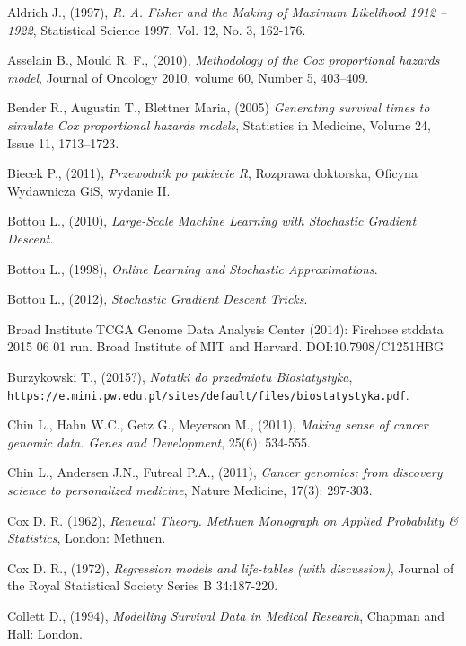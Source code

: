 \begin{thebibliography}{99}

 Aldrich J., (1997), \textit{R. A. Fisher and the Making of Maximum Likelihood 1912 – 1922}, Statistical Science 1997, Vol. 12, No. 3, 162-176.

 Asselain B., Mould R. F., (2010), \textit{Methodology of the Cox proportional hazards model},  Journal of Oncology 2010, volume 60, Number 5,  403–409.

 Bender R., Augustin T., Blettner Maria, (2005) \textit{Generating survival times to simulate Cox proportional hazards models}, Statistics in Medicine, Volume 24, Issue 11, 1713–1723.

 Biecek P., (2011), \textit{Przewodnik po pakiecie R}, Rozprawa doktorska, Oficyna Wydawnicza GiS, wydanie II.

 Bottou L., (2010), \textit{Large-Scale Machine Learning with Stochastic Gradient Descent}.

 Bottou L., (1998), \textit{Online Learning and Stochastic Approximations}.

 Bottou L., (2012), \textit{Stochastic Gradient Descent Tricks}.

 Broad Institute TCGA Genome Data Analysis Center (2014): Firehose stddata 2015 06 01 run. Broad Institute of MIT and Harvard. DOI:10.7908/C1251HBG

 Burzykowski T., (2015?), \textit{Notatki do przedmiotu Biostatystyka}, \texttt{https://e.mini.pw.edu.pl/sites/default/files/biostatystyka.pdf}.

 Chin L., Hahn W.C., Getz G., Meyerson M., (2011), \textit{Making sense of cancer genomic data. Genes and Development}, 25(6): 534-555.

 Chin L., Andersen J.N., Futreal P.A., (2011), \textit{Cancer genomics: from discovery science to personalized medicine}, Nature Medicine, 17(3): 297-303.

 Cox D. R. (1962), \textit{Renewal Theory. Methuen Monograph on Applied Probability
\& Statistics}, London: Methuen.

  Cox D. R., (1972), \textit{Regression models and life-tables (with discussion)}, Journal of the Royal Statistical Society Series B 34:187-220.


 Collett D., (1994), \textit{Modelling Survival Data in Medical Research}, Chapman and Hall:
London.


\end{thebibliography}
